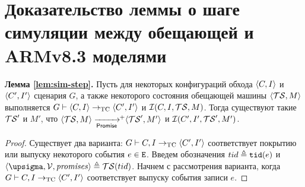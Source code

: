 \chapter{Доказательство леммы о шаге симуляции между обещающей и ARMv8.3 моделями}
\label{sec:sim-step-proof}

  {\bf Лемма \ref{lem:sim-step}.}
  Пусть для некоторых конфигураций обхода ${\langle{C, I}\rangle}$ и ${\langle{C', I'}\rangle}$ сценария $G$,
  а также некоторого состояния обещающей машины ${\langle{\ensuremath{\mathcal{TS}}, M}\rangle}$ выполняется
  $G \vdash {\langle{C, I}\rangle} \rightarrow_{\rm TC} {\langle{C', I'}\rangle}$ и
  $\mathcal{I}(C, I, \mathcal{TS}, M)$.
  Тогда существуют такие $\mathcal{TS}'$ и $M'$, что $\tup{\TSf, M} \stepp\!\!^{+} \tup{\TSf', M'}$ и
  $\mathcal{I}(C', I', \mathcal{TS}', M')$.
\begin{proof}%
  Существует два варианта: $G \vdash C, I \rightarrow_{\rm TC} {\langle{C', I'}\rangle}$ соответствует покрытию или
  выпуску некоторого события $e \in {\mathtt{E}}$. Введем обозначения $tid \triangleq {\mathtt{tid}}(e)$ и
  $\tup{\pstate, \View, \PromSet} \defeq \TSf(tid)$.
  Начнем с рассмотрения варианта, когда $G \vdash C, I \rightarrow_{\rm TC} {\langle{C', I'}\rangle}$ соответствует
  выпуску события записи $e$.


\end{proof}
